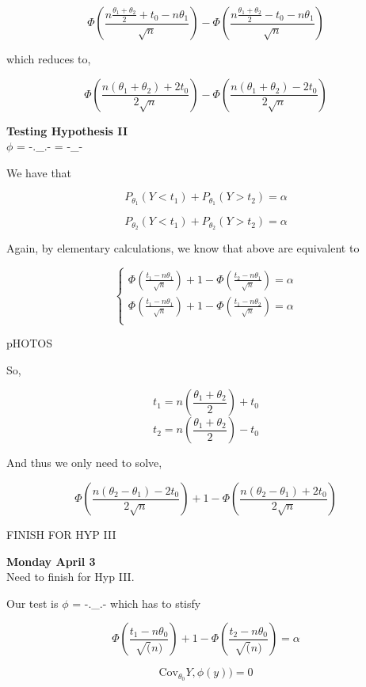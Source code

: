 \documentclass[11pt,fleqn]{book} %
\newcommand{\Cov}{\mathrm{Cov}}
\begin{document}
\begin{example}
			$$\Phi (\frac{n \frac{\theta_1 + \theta_2}{2} + t_0 - n\theta_1}{\sqrt{n}}) - \Phi (\frac{n \frac{\theta_1 + \theta_2}{2} - t_0 - n\theta_1}{\sqrt{n}}) $$

	which reduces to,

			$$\Phi \left(\frac{n (\theta_1 + \theta_2) + 2t_0 }{2\sqrt{n}}\right) - \Phi \left(\frac{n (\theta_1 + \theta_2) - 2t_0 }{2\sqrt{n}}\right) $$

\textbf{Testing Hypothesis II}\\

$\phi$ = -.\_.- = -\_-

We have that 

			$$P_{\theta_1} (Y < t_1) + P_{\theta_1} (Y > t_2) = \alpha $$

			$$P_{\theta_2} (Y < t_1) + P_{\theta_2} (Y > t_2) = \alpha $$


	Again, by elementary calculations, we know that above are equivalent to 

		$$ \left\{ \begin{array}{l}
			\Phi(\frac{t_1 - n \theta_1}{\sqrt{n}}) +1 - \Phi(\frac{t_2 - n \theta_1}{\sqrt{n}}) = \alpha\\
			\Phi(\frac{t_1 - n \theta_1}{\sqrt{n}}) +1 - \Phi(\frac{t_1 - n\theta_2}{\sqrt{n}}) = \alpha\\

		\end{array} \right.$$

	pHOTOS

	So, 

			$$t_1 = n(\frac{\theta_1 + \theta_2}{2}) + t_0 $$
			$$t_2 = n(\frac{\theta_1 + \theta_2}{2}) - t_0 $$

	And thus we only need to solve, 


		$$\Phi \left(\frac{n (\theta_2 - \theta_1) - 2t_0 }{2\sqrt{n}}\right) + 1 - \Phi \left(\frac{n (\theta_2 - \theta_1) + 2t_0 }{2\sqrt{n}}\right) $$

FINISH FOR HYP III


\end{example}


\textbf{Monday April 3}\\

Need to finish for Hyp III. 

Our test is $\phi$ = -.\_.- which has to stisfy


		$$ \Phi (\frac{t_1 - n\theta_0}{\sqrt(n)}) + 1 - \Phi (\frac{t_2 - n \theta_0}{\sqrt(n)}) = \alpha$$

		$$\Cov _{\theta_0} Y, \phi(y)) = 0 $$
\end{document}
